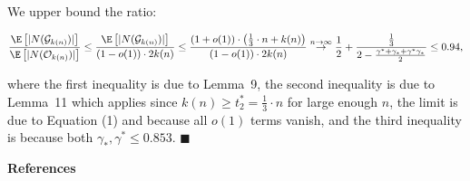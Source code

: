 \documentclass[10pt,a4paper]{article}
\begin{document}
We upper bound the ratio:\par


\[\begin{gathered}
\displaystyle\frac{\E\left[|N(\mathcal{G}_{k(n)})|\right]}{\E\left[|N(\mathcal{O}_{k(n)})|\right]}\leq\frac{\E\left[|N(\mathcal{G}_{k(n)})|\right]}{(1-o(1))\cdot 2k(n)}\leq\frac{(1+o(1))\cdot\left(\frac{1}{3}\cdot n+k(n)\right)}{(1-o(1))\cdot 2k(n)}\overset{n\rightarrow\infty}{\rightarrow}\frac{1}{2}+\frac{\frac{1}{3}}{2-\frac{\gamma^{*}+\gamma_{*}+\gamma^{*}\gamma_{*}}{2}}\leq 0.94,
\end{gathered}\]


where the first inequality is due to Lemma 9, the second inequality is due to Lemma 11 which applies since $k(n)\geq t^{*}_{2}=\frac{1}{3}\cdot n$ for large enough $n$, the limit is due to Equation (1) and because all $o(1)$ terms vanish, and the third inequality is because both $\gamma_{*},\gamma^{*}\leq 0.853$.
\ensuremath{\blacksquare}\par








\par\medskip\noindent\textbf{References}\par
\end{document}
